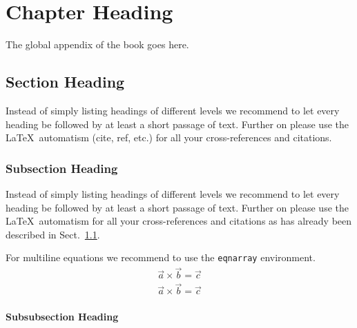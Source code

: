 %
%

\chapter{Chapter Heading}
\label{global:appendix} %

The global appendix of the book goes here.

\section{Section Heading}\label{global:appendix:A1}

Instead of simply listing headings of different levels we recommend to let every heading be followed by at least a short passage of text. Further on please use the \LaTeX\ automatism (cite, ref, etc.) for all your cross-references and citations.

\subsection{Subsection Heading}\label{global:appendix:A2}
Instead of simply listing headings of different levels we recommend to let every heading be followed by at least a short passage of text. Further on please use the \LaTeX\ automatism for all your cross-references and citations as has already been described in Sect.~\ref{global:appendix:A1}.

For multiline equations we recommend to use the \verb|eqnarray| environment.
\begin{eqnarray}
\vec{a}\times\vec{b}=\vec{c} \nonumber\\
\vec{a}\times\vec{b}=\vec{c}
\label{global:appendix:eq:1}
\end{eqnarray}

\subsubsection{Subsubsection Heading}\label{global:appendix:A2:1}

